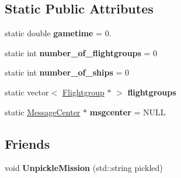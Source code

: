 \subsection*{Static Public Attributes}
\begin{DoxyCompactItemize}
\item 
static double {\bfseries gametime} = 0.\hypertarget{classMission_a66e970154d67da007dd4ccbdfa8e3d2e}{}\label{classMission_a66e970154d67da007dd4ccbdfa8e3d2e}

\item 
static int {\bfseries number\+\_\+of\+\_\+flightgroups} = 0\hypertarget{classMission_a620d75a2003e9195238e6e9c5a73b52c}{}\label{classMission_a620d75a2003e9195238e6e9c5a73b52c}

\item 
static int {\bfseries number\+\_\+of\+\_\+ships} = 0\hypertarget{classMission_a1388361866dccd4d0d2c08521a83e5d3}{}\label{classMission_a1388361866dccd4d0d2c08521a83e5d3}

\item 
static vector$<$ \hyperlink{classFlightgroup}{Flightgroup} $\ast$ $>$ {\bfseries flightgroups}\hypertarget{classMission_a4a7779a06a7a97838f60f0266ba2baed}{}\label{classMission_a4a7779a06a7a97838f60f0266ba2baed}

\item 
static \hyperlink{classMessageCenter}{Message\+Center} $\ast$ {\bfseries msgcenter} = N\+U\+LL\hypertarget{classMission_a3f6373313acf20ac3dcbd1d00d3c2e48}{}\label{classMission_a3f6373313acf20ac3dcbd1d00d3c2e48}

\end{DoxyCompactItemize}
\subsection*{Friends}
\begin{DoxyCompactItemize}
\item 
void {\bfseries Unpickle\+Mission} (std\+::string pickled)\hypertarget{classMission_a103b144aff8e084b9dfe7921acdada4a}{}\label{classMission_a103b144aff8e084b9dfe7921acdada4a}

\end{DoxyCompactItemize}


